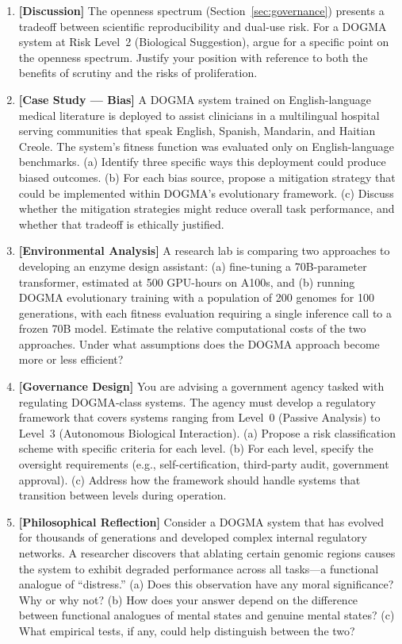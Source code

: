 \begin{enumerate}[label=\textbf{17.\arabic*.}, leftmargin=2.5em]
\item \textbf{[Discussion]} The openness spectrum (Section~\ref{sec:governance}) presents a tradeoff between scientific reproducibility and dual-use risk. For a DOGMA system at Risk Level~2 (Biological Suggestion), argue for a specific point on the openness spectrum. Justify your position with reference to both the benefits of scrutiny and the risks of proliferation.

\item \textbf{[Case Study --- Bias]} A DOGMA system trained on English-language medical literature is deployed to assist clinicians in a multilingual hospital serving communities that speak English, Spanish, Mandarin, and Haitian Creole. The system's fitness function was evaluated only on English-language benchmarks. (a) Identify three specific ways this deployment could produce biased outcomes. (b) For each bias source, propose a mitigation strategy that could be implemented within DOGMA's evolutionary framework. (c) Discuss whether the mitigation strategies might reduce overall task performance, and whether that tradeoff is ethically justified.

\item \textbf{[Environmental Analysis]} A research lab is comparing two approaches to developing an enzyme design assistant: (a) fine-tuning a 70B-parameter transformer, estimated at 500 GPU-hours on A100s, and (b) running DOGMA evolutionary training with a population of 200 genomes for 100 generations, with each fitness evaluation requiring a single inference call to a frozen 70B model. Estimate the relative computational costs of the two approaches. Under what assumptions does the DOGMA approach become more or less efficient?

\item \textbf{[Governance Design]} You are advising a government agency tasked with regulating DOGMA-class systems. The agency must develop a regulatory framework that covers systems ranging from Level~0 (Passive Analysis) to Level~3 (Autonomous Biological Interaction). (a) Propose a risk classification scheme with specific criteria for each level. (b) For each level, specify the oversight requirements (e.g., self-certification, third-party audit, government approval). (c) Address how the framework should handle systems that transition between levels during operation.

\item \textbf{[Philosophical Reflection]} Consider a DOGMA system that has evolved for thousands of generations and developed complex internal regulatory networks. A researcher discovers that ablating certain genomic regions causes the system to exhibit degraded performance across all tasks---a functional analogue of ``distress.'' (a) Does this observation have any moral significance? Why or why not? (b) How does your answer depend on the difference between functional analogues of mental states and genuine mental states? (c) What empirical tests, if any, could help distinguish between the two?


\end{enumerate}
